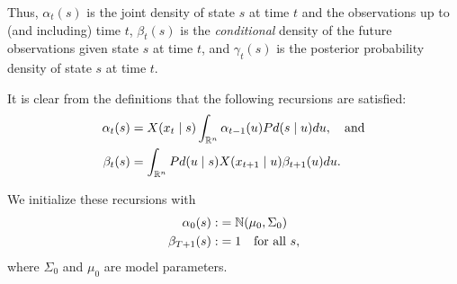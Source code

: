 \documentclass[12pt,leqno]{article}
\begin{document}
Thus, $\alpha_t(s)$ is the joint density of state $s$ at time $t$ and the observations up to (and including) time $t$,
$\beta_t(s)$ is the {\em conditional} density of the future observations given state $s$ at time $t$, and $\gamma_t(s)$
is the posterior probability density of state $s$ at time $t$.

It is clear from the definitions that the following recursions are satisfied:
\begin{align}
\alpha_t(s) &= X(x_t \mid s)\int_{{\mathbb R}^n}\alpha_{t-1}(u)Pd(s \mid u)du,\quad\text{and}\label{alpha:0}\\
\beta_t(s) &= \int_{{\mathbb R}^{n}}Pd(u \mid s)X(x_{t+1} \mid u)\beta_{t+1}(u)du.\label{beta:0}
\end{align}

We initialize these recursions with
\begin{align*}
\alpha_0(s) :&= {\mathbb N}(\mu_0,\Sigma_0) \\
\beta_{T+1}(s) :&= 1 \quad\text{for all $s$},
\end{align*}
where $\Sigma_0$ and $\mu_0$ are model parameters.
\end{document}
